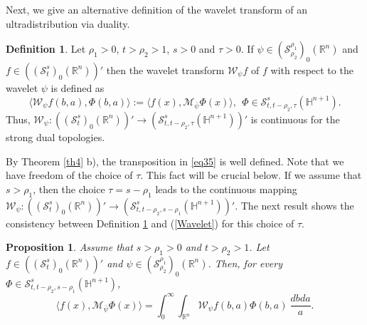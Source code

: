 \documentclass[reqno,12pt]{amsart}
\theoremstyle{plain}
\newtheorem{proposition}{Proposition}
\theoremstyle{definition}
\newtheorem{definition}{Definition}
\theoremstyle{remark}
\begin{document}
Next, we give an alternative definition of the wavelet transform of an ultradistribution via duality.

\par

\begin{definition} \label{def1}
Let $\rho_{1}>0$, $ t > \rho_2>1 $, $s>0$ and $\tau>0$.
If $ \psi \in ({\mathcal S}^{\rho_1}_{\rho_2})_0 (\mathbb{R}^n) $
and $ f \in (({\mathcal S}^s_{t} )_0 (\mathbb{R}^n))'$
then the wavelet transform $ {\mathcal W}_{\psi} f$  of $ f $ with respect to
the wavelet $ \psi$ is defined as
\begin{equation} \label{eq35}
\langle {\mathcal W}_{\psi} f(b, a), \Phi(b, a) \rangle := \langle
f(x), {\mathcal M}_{\bar{\psi}} \Phi (x) \rangle, \: \: \Phi \in {\mathcal S}^s_{t, t - \rho_2, \tau}(\mathbb{H}^{n+1}).
\end{equation}
Thus,
$  {\mathcal W}_{\psi} : (({\mathcal S}^s_{t})_0 (\mathbb{R}^n))'
\to ({\mathcal S}^s_{t, t - \rho_2, \tau}(\mathbb{H}^{n+1}))'$ is continuous for the strong dual topologies.
\end{definition}

\par

By Theorem \ref{th4}  b), the transposition in \eqref{eq35} is well defined. Note that we have freedom of
the choice of $\tau$. This fact will be crucial below. If we assume that $s>\rho_1$, then the choice $\tau=s-\rho_1$ leads to the continuous mapping $  {\mathcal W}_{\psi} : (({\mathcal S}^s_{t})_0 (\mathbb{R}^n))'
\to ({\mathcal S}^s_{t, t - \rho_2, s-\rho_1}(\mathbb{H}^{n+1}))'$.
The next result shows the consistency between Definition \ref{def1} and (\ref{Wavelet}) for this choice of $\tau$.

\begin{proposition}
\label{proposition consistency} Assume that $s > \rho_1>0$ and $ t > \rho_2>1 $. Let $ f \in (({\mathcal S}^s_{t} )_0 (\mathbb{R}^n))'$ and $ \psi \in ({\mathcal S}^{\rho_1}_{\rho_2})_0 (\mathbb{R}^n) $. Then, for every $\Phi \in {\mathcal S}^s_{t, t - \rho_2, s-\rho_1}(\mathbb{H}^{n+1})$,
\begin{equation}
\label{equation consistency}
\langle
f(x), {\mathcal M}_{\bar{\psi}} \Phi (x) \rangle= \int_{0}^{\infty}\int_{\mathbb{R}^{n}}\mathcal{W}_{\psi}f(b,a)\Phi(b,a)\:\frac{dbda}{a}.
\end{equation}
\end{proposition}
\end{document}
